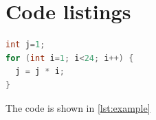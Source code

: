 \section{Code listings}

\begin{lstlisting}[float=h,language=Java,frame=tb,caption={Beispielcode},label=lst:example]
int j=1;
for (int i=1; i<24; i++) {
  j = j * i;
}
\end{lstlisting}

The code is shown in \autoref{lst:example}
